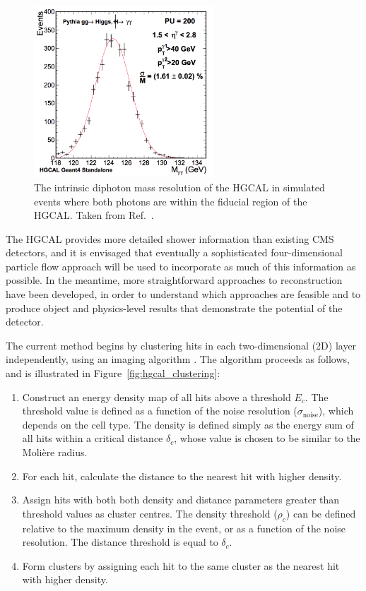 \begin{figure}[h!]
  \centering
  \includegraphics[width=0.6\textwidth]{Figures/HGCAL/HggReso.png}
  \caption[HGCAL diphoton mass resolution.]
  {
    The intrinsic diphoton mass resolution of the HGCAL in simulated \Hgg events 
    where both photons are within the fiducial region of the HGCAL. 
    Taken from Ref.~\cite{HGCAL}.
  }
  \label{fig:hgcal_DiphotonReso}
\end{figure}

The HGCAL provides more detailed shower information than existing CMS detectors, 
and it is envisaged that eventually a sophisticated four-dimensional particle flow approach will be used to incorporate as much of this information as possible. 
In the meantime, more straightforward approaches to reconstruction have been developed, 
in order to understand which approaches are feasible and to produce object and physics-level results that demonstrate the potential of the detector. 

The current method begins by clustering hits in each two-dimensional (2D) layer independently, using an imaging algorithm \cite{ClusteringAlgo}.
The algorithm proceeds as follows, and is illustrated in Figure~\ref{fig:hgcal_clustering}:
\begin{enumerate}
  \item Construct an energy density map of all hits above a threshold $E_c$. 
  The threshold value is defined as a function of the noise resolution ($\sigma_{\textrm{noise}}$), which depends on the cell type.
  The density is defined simply as the energy sum of all hits within a critical distance $\delta_c$, 
  whose value is chosen to be similar to the Moli\`ere radius. %
  \item For each hit, calculate the distance to the nearest hit with higher density.
  \item Assign hits with both both density and distance parameters greater than threshold values as cluster centres.
  The density threshold ($\rho_c$) can be defined relative to the maximum density in the event,
  or as a function of the noise resolution.
  The distance threshold is equal to $\delta_c$.
  \item Form clusters by assigning each hit to the same cluster as the nearest hit with higher density.
\end{enumerate}

